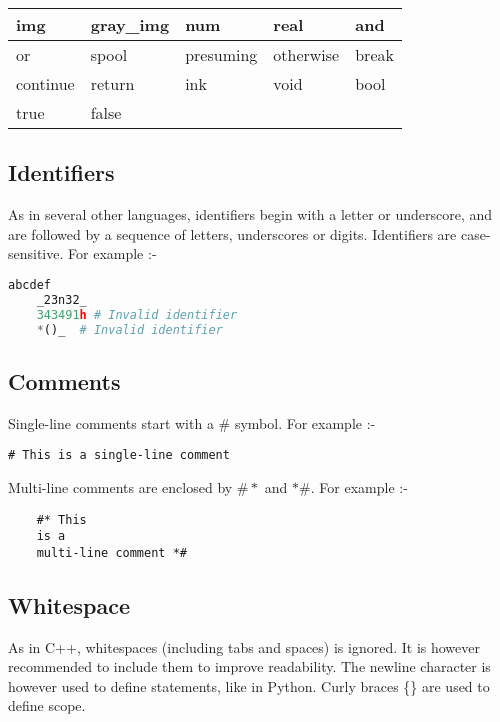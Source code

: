 \documentclass[a4paper, 11pt]{article}
\begin{document}
  \begin{tabular}{ |p{3cm}|p{3cm}|p{3cm}|p{3cm}|p{3cm}| }
    \hline
    img & gray\_img & num & real & and\\
    \hline
    or & spool & presuming & otherwise & break \\
    \hline
    continue & return & ink & void & bool\\
    \hline
    true & false & & &\\
    \hline
   \end{tabular}

  \subsection{Identifiers}
  
    As in several other languages, identifiers begin with a letter or underscore, and are followed by a sequence of letters, underscores or digits. Identifiers are case-sensitive. For example :-
   \begin{lstlisting}[language=Python]
    abcdef
    _23n32_
    343491h # Invalid identifier
    *()_  # Invalid identifier\end{lstlisting}


  \subsection{Comments}

  Single-line comments start with a $\#$ symbol. For example :-

  \begin{lstlisting}[]
    # This is a single-line comment\end{lstlisting}

  Multi-line comments are enclosed by $\#*$ and $*\#$. For example :-

  \begin{lstlisting}
    #* This
    is a
    multi-line comment *#\end{lstlisting}

    \subsection{Whitespace}

    As in C++, whitespaces (including tabs and spaces) is ignored. It is however recommended to include them to improve readability. 
    The newline character is however used to define statements, like in Python. Curly braces \{\} are used to define scope. 
\end{document}
